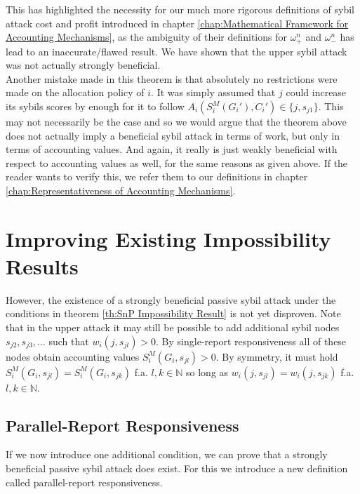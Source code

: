 \noindent{}This has highlighted the necessity for our much more rigorous definitions of sybil attack cost and profit introduced in chapter \ref{chap:Mathematical Framework for Accounting Mechanisms}, as the ambiguity of their definitions for $\omega_{+}^n$ and $\omega_{-}^n$ has lead to an inaccurate/flawed result. We have shown that the upper sybil attack was not actually strongly beneficial.\vspace{1em}\\

\noindent{}Another mistake made in this theorem is that absolutely no restrictions were made on the allocation policy of $i$. It was simply assumed that $j$ could increase its sybils scores by enough for it to follow $A_i(S^M_i(G_i'),C_i')\in\lbrace{}j,s_{j1}\rbrace$. This may not necessarily be the case and so we would argue that the theorem above does not actually imply a beneficial sybil attack in terms of work, but only in terms of accounting values. And again, it really is just weakly beneficial with respect to accounting values as well, for the same reasons as given above. If the reader wants to verify this, we refer them to our definitions in chapter \ref{chap:Representativeness of Accounting Mechanisms}. \vspace{1em}\\

\section{Improving Existing Impossibility Results}
\label{Improving Existing Impossibility Results}
\noindent{}However, the existence of a strongly beneficial passive sybil attack under the conditions in theorem \ref{th:SnP Impossibility Result} is not yet disproven. Note that in the upper attack it may still be possible to add additional sybil nodes $s_{j2},s_{j3},\ldots$ such that $w_i(j,s_{jl})>0$. By single-report responsiveness all of these nodes obtain accounting values $S^M_{i}(G_i,s_{jl})>0$. By symmetry, it must hold $S^M_{i}(G_i,s_{jl})=S^M_{i}(G_i,s_{jk})$ f.a. $l,k\in\mathbb{N}$ so long as $w_i(j,s_{jl})=w_i(j,s_{jk})$ f.a. $l,k\in\mathbb{N}$. \vspace{1em}\\

\subsection{Parallel-Report Responsiveness}
\label{subsec:Parallel-report Responsiveness}
\noindent{}If we now introduce one additional condition, we can prove that a strongly beneficial passive sybil attack does exist. For this we introduce a new definition called parallel-report responsiveness. \vspace{1em}\\

